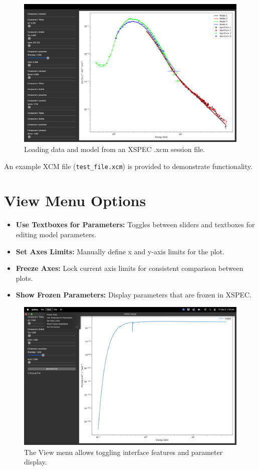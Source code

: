 \documentclass[11pt]{article}
\begin{document}
\begin{figure}[H]
    \centering
    \includegraphics[width=0.7\linewidth]{documentation_images/load_data_as_xcm.png}
    \caption{Loading data and model from an XSPEC .xcm session file.}
\end{figure}

\noindent
An example XCM file (\texttt{test\_file.xcm}) is provided to demonstrate functionality.

\section*{View Menu Options}

\begin{itemize}
    \item \textbf{Use Textboxes for Parameters:} Toggles between sliders and textboxes for editing model parameters.
    \item \textbf{Set Axes Limits:} Manually define x and y-axis limits for the plot.
    \item \textbf{Freeze Axes:} Lock current axis limits for consistent comparison between plots.
    \item \textbf{Show Frozen Parameters:} Display parameters that are frozen in XSPEC.
\end{itemize}

\begin{figure}[H]
    \centering
    \includegraphics[width=0.7\linewidth]{documentation_images/view_menu.png}
    \caption{The View menu allows toggling interface features and parameter display.}
\end{figure}
\end{document}
